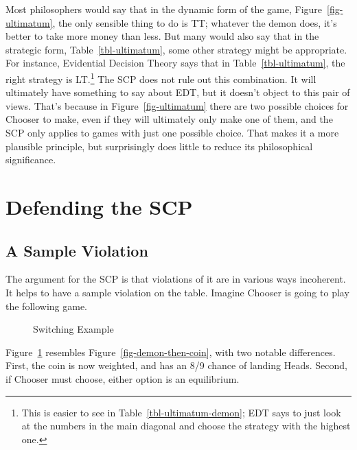 \documentclass[
  10pt,
  letterpaper,
  DIV=11,
  numbers=noendperiod,
  twoside]{scrartcl}
\begin{document}
Most philosophers would say that in the dynamic form of the game,
Figure~\ref{fig-ultimatum}, the only sensible thing to do is TT;
whatever the demon does, it's better to take more money than less. But
many would also say that in the strategic form,
Table~\ref{tbl-ultimatum}, some other strategy might be appropriate. For
instance, Evidential Decision Theory says that in
Table~\ref{tbl-ultimatum}, the right strategy is LT.\footnote{This is
  easier to see in Table~\ref{tbl-ultimatum-demon}; EDT says to just
  look at the numbers in the main diagonal and choose the strategy with
  the highest one.} The SCP does not rule out this combination. It will
ultimately have something to say about EDT, but it doesn't object to
this pair of views. That's because in Figure~\ref{fig-ultimatum} there
are two possible choices for Chooser to make, even if they will
ultimately only make one of them, and the SCP only applies to games with
just one possible choice. That makes it a more plausible principle, but
surprisingly does little to reduce its philosophical significance.

\section{Defending the SCP}\label{sec-scp-defence}

\subsection{A Sample Violation}\label{a-sample-violation}

The argument for the SCP is that violations of it are in various ways
incoherent. It helps to have a sample violation on the table. Imagine
Chooser is going to play the following game.

\begin{figure}


\caption{\label{fig-sample-violation}Switching Example}

\end{figure}%

Figure~\ref{fig-sample-violation} resembles
Figure~\ref{fig-demon-then-coin}, with two notable differences. First,
the coin is now weighted, and has an 8/9 chance of landing Heads.
Second, if Chooser must choose, either option is an equilibrium.
\end{document}

